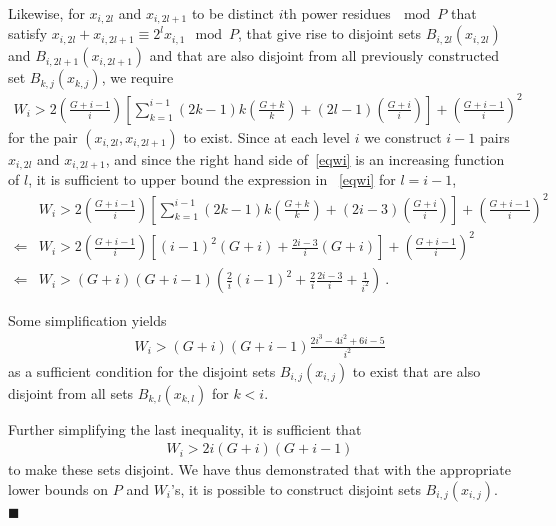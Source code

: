 Likewise, for  $x_{i,2l}$ and $x_{i,2l+1}$ to be distinct $i$th
power residues$~\mod P$ that satisfy $x_{i,2l}+ x_{i,2l+1} \equiv
2^lx_{i,1} \mod P$, that give rise to disjoint sets
$B_{i,2l}(x_{i,2l})$ and $B_{i,2l+1}(x_{i,2l+1})$ and that are also
disjoint from all previously constructed set $B_{k,j}(x_{k,j})$, we
require
\begin{equation}\label{eqwi}\begin{array}{lll} W_i>
2(\frac{G+i-1}{i}) \left[\sum_{k=1}^{i-1}
(2k-1)k(\frac{G+k}{k})+(2l-1)\left(
\frac{G+i}{i}\right)\right]+\left( \frac{G+i-1}{i}\right)^2
\end{array}\end{equation}
for the pair $(x_{i,2l},x_{i,2l+1})$ to exist. Since at each level
$i$ we construct $i-1$ pairs $x_{i,2l}$ and $x_{i,2l+1}$, and since
the right hand side of~\eqref{eqwi} is an increasing function of
$l$, it is sufficient to upper bound the expression in ~\eqref{eqwi}
for $l=i-1$,
\begin{equation}\label{eqwi}\begin{array}{lll} {}&W_i>
2(\frac{G+i-1}{i}) \left[\sum_{k=1}^{i-1}
(2k-1)k(\frac{G+k}{k})+(2i-3)\left(
\frac{G+i}{i}\right)\right]+\left( \frac{G+i-1}{i}\right)^2\\
\Leftarrow & W_i > 2(\frac{G+i-1}{i}) \left[
(i-1)^2(G+i)+\frac{2i-3}{i} (G+i)\right]+\left(
\frac{G+i-1}{i}\right)^2 \\\Leftarrow & W_i > (G+i)(G+i-1) \left(
\frac{2}{i}(i-1)^2+\frac{2}{i}\frac{2i-3}{i}+\frac{1}{i^2} \right)~.
\end{array}\end{equation}


Some simplification yields
\begin{equation}\begin{array}{lll} W_i>
(G+i)(G+i-1)\frac{2i^3-4i^2+6i-5}{i^2}
\end{array}\end{equation}
as a sufficient condition for the disjoint sets $B_{i,j}(x_{i,j})$
to exist that are also disjoint from all sets $B_{k,l}(x_{k,l})$ for
$k<i$.

Further simplifying the last inequality, it is sufficient that
\begin{equation}\begin{array}{lll} W_i>
2i(G+i)(G+i-1)
\end{array}\end{equation}
to make these sets disjoint. We have thus demonstrated that with the
appropriate lower bounds on $P$ and $W_i$'s, it is possible to
construct disjoint sets $B_{i,j}(x_{i,j})$.
 \hfill$\blacksquare$

